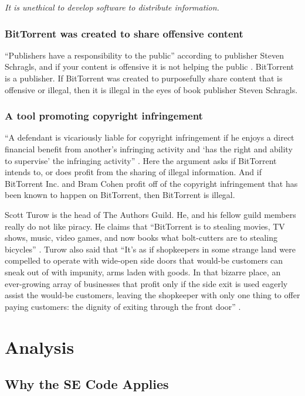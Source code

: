 \documentclass[11pt]{article}
\begin{document}
\begin{multicols}{2}
\textit{It is unethical to develop software to distribute information.}

\subsubsection{BitTorrent was created to share offensive content}

``Publishers have a responsibility to the public'' according to publisher Steven Schragls, and if your content is offensive it is not helping the public \cite[46]{hawker}. BitTorrent is a publisher. If BitTorrent was created to purposefully share content that is offensive or illegal, then it is illegal in the eyes of book publisher Steven Schragls.

\subsubsection{A tool promoting copyright infringement}

``A defendant is vicariously liable for copyright infringement if he enjoys a direct financial benefit from another's infringing activity and `has the right and ability to supervise' the infringing activity'' \cite{2000m}. Here the argument asks if BitTorrent intends to, or does profit from the sharing of illegal information. And if BitTorrent Inc. and Bram Cohen profit off of the copyright infringement that has been known to happen on BitTorrent, then BitTorrent is illegal.

Scott Turow is the head of The Authors Guild. He, and his fellow guild members really do not like piracy. He claims that ``BitTorrent is to stealing movies, TV shows, music, video games, and now books what bolt-cutters are to stealing bicycles'' \cite{turow}. Turow also said that ``It's as if shopkeepers in some strange land were compelled to operate with wide-open side doors that would-be customers can sneak out of with impunity, arms laden with goods. In that bizarre place, an ever-growing array of businesses that profit only if the side exit is used eagerly assist the would-be customers, leaving the shopkeeper with only one thing to offer paying customers: the dignity of exiting through the front door'' \cite{turow}.

\section{Analysis}

\subsection{Why the SE Code Applies}


\end{multicols}
\end{document}
